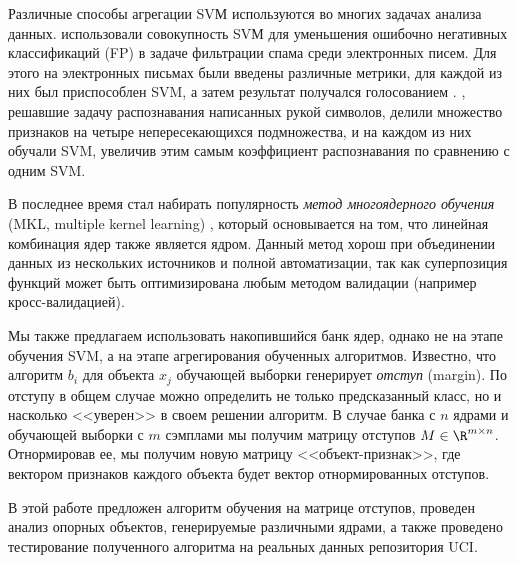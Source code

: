\documentclass[a4paper, 10pt]{article}
\begin{document}
\begin{multicols}{2}
	Различные способы агрегации SVМ используются во многих задачах анализа данных. 
	 использовали совокупность SVМ для уменьшения ошибочно негативных классификаций (FP) в задаче фильтрации спама среди электронных писем. 
	Для этого на электронных письмах были введены различные метрики, для каждой из них был приспособлен SVM, а затем результат получался голосованием \cite{Kittler1996}. 
	, решавшие задачу распознавания написанных рукой символов, делили множество признаков на четыре непересекающихся подмножества, и на каждом из них обучали SVM, увеличив этим самым коэффициент распознавания по сравнению с одним SVM.
	
	В последнее время стал набирать популярность \emph{метод многоядерного обучения} (MKL, multiple kernel learning) \cite{Dyrba2015} \cite{Bucak2014}\cite{Althloothi2014}, который основывается на том, что линейная комбинация ядер также является ядром. Данный метод хорош при объединении данных из нескольких источников и полной автоматизации, так как суперпозиция функций может быть оптимизирована любым методом валидации (например кросс-валидацией).
	 
	
	Мы также предлагаем использовать накопившийся банк ядер, однако не на этапе обучения SVM, а на этапе агрегирования обученных алгоритмов. Известно, что алгоритм $b_i$ для объекта $x_j$ обучающей выборки генерирует \emph{отступ} (margin). По отступу в общем случае можно определить не только предсказанный класс, но и насколько <<уверен>> в своем решении алгоритм. В случае банка с $n$ ядрами и обучающей выборки с $m$ сэмплами
	мы получим матрицу отступов $M \in \R^{m\times n}$. Отнормировав ее, мы получим новую матрицу <<объект-признак>>, где вектором признаков каждого объекта будет вектор отнормированных отступов.
	
	В этой работе предложен алгоритм обучения на матрице отступов, проведен анализ опорных объектов, генерируемые различными ядрами, а также проведено тестирование полученного алгоритма на реальных данных репозитория UCI. 

\printbibliography
\end{multicols}
\end{document}
